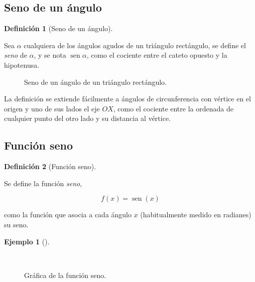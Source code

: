 \documentclass[
  a4paper,
]{scrreport}
\theoremstyle{plain}
\theoremstyle{plain}
\theoremstyle{definition}
\newtheorem{definition}{Definición}[chapter]
\theoremstyle{definition}
\newtheorem{example}{Ejemplo}[chapter]
\theoremstyle{plain}
\theoremstyle{remark}
\begin{document}
\hypertarget{seno-de-un-uxe1ngulo}{%
\subsection{Seno de un ángulo}\label{seno-de-un-uxe1ngulo}}

\leavevmode{}%
\begin{definition}[Seno de un ángulo]\label{def-seno-angulo}

Sea \(\alpha\) cualquiera de los ángulos agudos de un triángulo
rectángulo, se define el \emph{seno} de \(\alpha\), y se nota
\(\operatorname{sen} \alpha\), como el cociente entre el cateto opuesto
y la hipotenusa.

\end{definition}

\begin{figure}

{\centering 



}

\caption{Seno de un ángulo de un triángulo rectángulo.}

\end{figure}

La definición se extiende fácilmente a ángulos de circunferencia con
vértice en el origen y uno de sus lados el eje \(OX\), como el cociente
entre la ordenada de cualquier punto del otro lado y su distancia al
vértice.

\hypertarget{funciuxf3n-seno}{%
\subsection{Función seno}\label{funciuxf3n-seno}}

\leavevmode{}%
\begin{definition}[Función seno]\label{def-funcion-seno}

Se define la función \emph{seno},

\[f(x)=\operatorname{sen}(x)\]

como la función que asocia a cada ángulo \(x\) (habitualmente medido en
radianes) su seno.

\end{definition}

\leavevmode{}%
\begin{example}[]\label{exm-funcion-seno}

~

\begin{figure}

{\centering 



}

\caption{Gráfica de la función seno.}

\end{figure}

\end{example}
\end{document}
